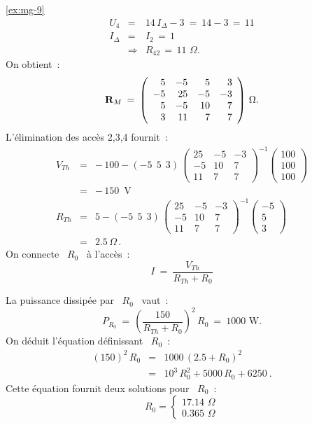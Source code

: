 \begin{solexercise}{\ref{ex:mg-9}}
\begin{eqnarray*}
	U_4 &=& 14\, I_{\Delta} - 3 \: = \: 14-3 \, = \, 11\\
	I_{\Delta} &=& I_2 \, = \, 1\\
	& \Rightarrow & R_{42} \, = \, 11\,\, \Omega\text{.}
\end{eqnarray*}
On obtient~:
\[ {\bf R}_M \: = \: 
\left( \begin{array}{rrrr}
5 & -5 & 5 & 3\\
-5 & 25 & -5 & -3\\ 
5 & -5 & 10 & 7\\
3 & 11 & 7 & 7
\end{array} \right)\,\Omega\text{.} \]
L'élimination des accès 2,3,4 fournit~:
\begin{eqnarray*}
	V_{Th} &=& -\, 100 - \left( -5 ~~5~~3 \right) \, 
	\left( \begin{array}{rrr}
		25 & -5 & -3\\
		-5 & 10 & 7\\
		11 & 7 & 7
	\end{array} \right) ^{-1}
	\left( \begin{array}{c} 100\\ 100\\ 100 \end{array} \right)\\
	&=& -\, 150\, \text{~V}\\
	R_{Th} &=& 5 - \left( -5 ~~5 ~~3 \right) \,
	\left( \begin{array}{rrr}
		25 & -5 & -3\\
		-5 & 10 & 7\\
		11 & 7 & 7
	\end{array} \right) ^{-1}
	\left( \begin{array}{r} -5\\ 5\\ 3 \end{array} \right)\\
	&=& 2.5\, \Omega \,\text{.}
\end{eqnarray*}
On connecte \ $R_0$ \ à l'accès~:
\[I \: = \: \dfrac{V_{Th}}{R_{Th} + R_0}\]

La puissance dissipée par \ $R_0$ \ vaut~:
\[ P_{R_0} \: = \, \left( \frac{150}{R_{Th}+ R_0} \right)^2\, R_0 \:= \: 1000\,\, \text{W.} \]
On déduit l'équation définissant \ $R_0$~:
\begin{eqnarray*}
	(150)^2\, R_0 
	&=& 1000 \, (2.5 + R_0)^2\\
	&=& 10^3\, R_0^2 + 5000\, R_0 + 6250~.
\end{eqnarray*}
Cette équation fournit deux solutions pour \ $R_0$~:
\[ R_0 =
\begin{cases}
17.14 \,\,\Omega\\
0.365\,\,\Omega
\end{cases}\]


\end{solexercise}

